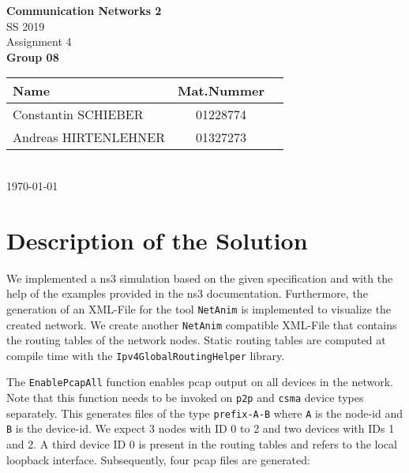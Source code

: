 \documentclass[parskip=full]{scrartcl}
\begin{document}
\begin{titlepage}
    \centering
    \vspace*{2cm}
    {\Huge \textbf{Communication Networks 2}}\\
    SS 2019\\
    \vspace*{1cm}
    {\Large Assignment 4}
    \\\vspace*{3cm}
    {\Large \textbf{Group 08}}\\
    \vspace*{1cm}
    {\large 
        \begin{tabular}{l c c}
            Name & Mat.Nummer \\ \hline
            Constantin SCHIEBER & 01228774 \\
            Andreas HIRTENLEHNER & 01327273
        \end{tabular}
    }
    \\\vspace*{7cm}
    \today
\end{titlepage}


\section{Description of the Solution}

We implemented a ns3 simulation based on the given specification and with the help of the examples provided in the ns3 documentation.
Furthermore, the generation of an XML-File for the tool \texttt{NetAnim} is implemented to visualize the created network.
We create another \texttt{NetAnim} compatible XML-File that contains the routing tables of the network nodes.
Static routing tables are computed at compile time with the \texttt{Ipv4GlobalRoutingHelper} library.

The \texttt{EnablePcapAll} function enables pcap output on all devices in the network. 
Note that this function needs to be invoked on \texttt{p2p} and \texttt{csma} device types separately.
This generates files of the type \texttt{prefix-A-B} where \texttt{A} is the node-id and \texttt{B} is the device-id. 
We expect 3 nodes with ID 0 to 2 and two devices with IDs 1 and 2. 
A third device ID 0 is present in the routing tables and refers to the local loopback interface. 
Subsequently, four pcap files are generated:
\end{document}
